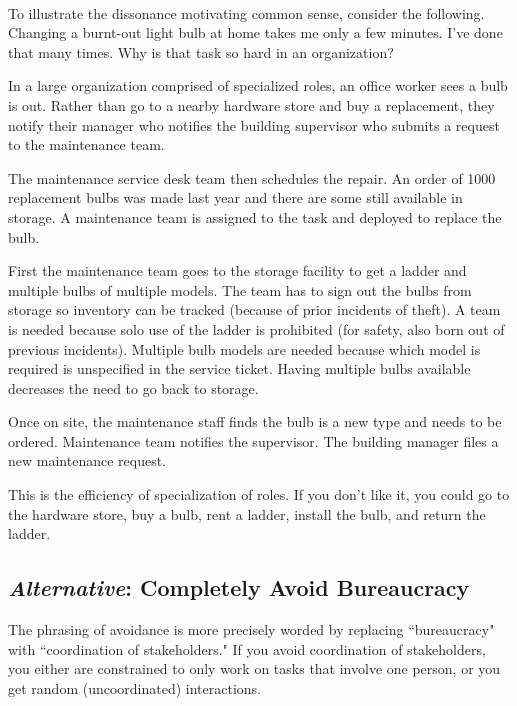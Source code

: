 \ \\

To illustrate the dissonance motivating common sense, consider the following. 
Changing a burnt-out light bulb at home takes me only a few minutes. I've done that many times. Why is that task so hard in an organization?

\begin{mdframed}[frametitle={Changing a Lightbulb},frametitlerule=true,frametitlealignment=\centering]
In a large organization comprised of specialized roles, an office worker sees a bulb is out. Rather than go to a nearby hardware store and buy a replacement, they notify their manager who notifies the building supervisor who submits a request to the maintenance team. 

The maintenance service desk team then schedules the repair. An order of 1000 replacement bulbs was made last year and there are some still available in storage. A maintenance team is assigned to the task and deployed to replace the bulb. 

First the maintenance team goes to the storage facility to get a ladder and multiple bulbs of multiple models. The team has to sign out the bulbs from storage so inventory can be tracked (because of prior incidents of theft). A team is needed because solo use of the ladder is prohibited (for safety, also born out of previous incidents). Multiple bulb models are needed because which model is required is unspecified in the service ticket. Having multiple bulbs available decreases the need to go back to storage. 

Once on site, the maintenance staff finds the bulb is a new type and needs to be ordered. Maintenance team notifies the supervisor. The building manager files a new maintenance request.
\end{mdframed}

This is the efficiency of specialization of roles. If you don't like it, you could go to the hardware store, buy a bulb, rent a ladder, install the bulb, and return the ladder.


\subsection*{\textit{Alternative}: Completely Avoid Bureaucracy}
The phrasing of avoidance is more precisely worded by replacing ``bureaucracy" with ``coordination of stakeholders." If you avoid coordination of stakeholders, you either are constrained to only work on tasks that involve one person, or you get random (uncoordinated) interactions. 


